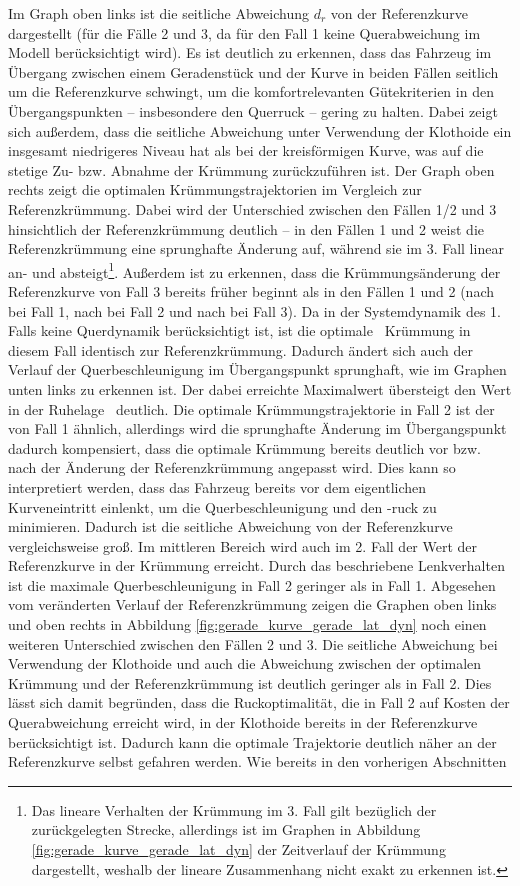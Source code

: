 Im Graph oben links ist die seitliche Abweichung $d_r$ von der Referenzkurve dargestellt (für die Fälle 2 und 3, da für den Fall 1 keine Querabweichung im Modell berücksichtigt wird). Es ist deutlich zu erkennen, dass das Fahrzeug im Übergang zwischen einem Geradenstück und der Kurve in beiden Fällen seitlich um die Referenzkurve schwingt, um die komfortrelevanten Gütekriterien in den Übergangspunkten -- insbesondere den Querruck -- gering zu halten. Dabei zeigt sich außerdem, dass die seitliche Abweichung unter Verwendung der Klothoide ein insgesamt niedrigeres Niveau hat als bei der kreisförmigen Kurve, was auf die stetige Zu- bzw. Abnahme der Krümmung zurückzuführen ist. Der Graph oben rechts zeigt die optimalen Krümmungstrajektorien im Vergleich zur Referenzkrümmung. Dabei wird der Unterschied zwischen den Fällen 1/2 und 3 hinsichtlich der Referenzkrümmung deutlich -- in den Fällen 1 und 2 weist die Referenzkrümmung eine sprunghafte Änderung auf, während sie im 3. Fall linear an- und absteigt\footnote{Das lineare Verhalten der Krümmung im 3. Fall gilt bezüglich der zurückgelegten Strecke, allerdings ist im Graphen in Abbildung \ref{fig:gerade_kurve_gerade_lat_dyn} der Zeitverlauf der Krümmung dargestellt, weshalb der lineare Zusammenhang nicht exakt zu erkennen ist.}. Außerdem ist zu erkennen, dass die Krümmungsänderung der Referenzkurve von Fall 3 bereits früher beginnt als in den Fällen 1 und 2 (nach  bei Fall 1, nach  bei Fall 2 und nach  bei Fall 3). Da in der Systemdynamik des 1. Falls keine Querdynamik berücksichtigt ist, ist die \glqq optimale\grqq~ Krümmung in diesem Fall identisch zur Referenzkrümmung. Dadurch ändert sich auch der Verlauf der Querbeschleunigung im Übergangspunkt sprunghaft, wie im Graphen unten links zu erkennen ist. Der dabei erreichte Maximalwert übersteigt den Wert in der Ruhelage \ayRL~deutlich. Die optimale Krümmungstrajektorie in Fall 2 ist der von Fall 1 ähnlich, allerdings wird die sprunghafte Änderung im Übergangspunkt dadurch kompensiert, dass die optimale Krümmung bereits deutlich vor bzw. nach der Änderung der Referenzkrümmung angepasst wird. Dies kann so interpretiert werden, dass das Fahrzeug bereits vor dem eigentlichen Kurveneintritt einlenkt, um die Querbeschleunigung und den -ruck zu minimieren. Dadurch ist die seitliche Abweichung von der Referenzkurve vergleichsweise groß. Im mittleren Bereich wird auch im 2. Fall der Wert der Referenzkurve in der Krümmung erreicht. Durch das beschriebene Lenkverhalten ist die maximale Querbeschleunigung in Fall 2 geringer als in Fall 1. Abgesehen vom veränderten Verlauf der Referenzkrümmung zeigen die Graphen oben links und oben rechts in Abbildung \ref{fig:gerade_kurve_gerade_lat_dyn} noch einen weiteren Unterschied zwischen den Fällen 2 und 3. Die seitliche Abweichung bei Verwendung der Klothoide und auch die Abweichung zwischen der optimalen Krümmung und der Referenzkrümmung ist deutlich geringer als in Fall 2. Dies lässt sich damit begründen, dass die Ruckoptimalität, die in Fall 2 auf Kosten der Querabweichung erreicht wird, in der Klothoide bereits in der Referenzkurve berücksichtigt ist. Dadurch kann die optimale Trajektorie deutlich näher an der Referenzkurve selbst gefahren werden. Wie bereits in den vorherigen Abschnitten 